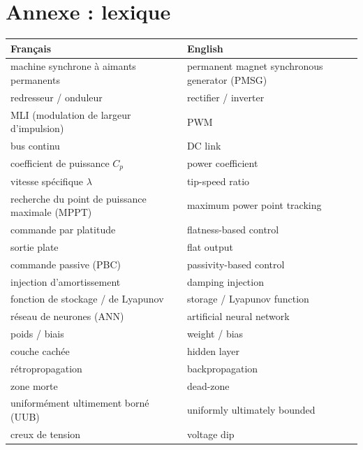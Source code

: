 \documentclass[11pt,a4paper]{article}
\begin{document}
\section*{Annexe : lexique}
\begin{center}\small
\begin{tabular}{ll}
\toprule
Français & English\\
\midrule
machine synchrone à aimants permanents & permanent magnet synchronous generator (PMSG)\\
redresseur / onduleur & rectifier / inverter\\
MLI (modulation de largeur d'impulsion) & PWM\\
bus continu & DC link\\
coefficient de puissance $C_p$ & power coefficient\\
vitesse spécifique $\lambda$ & tip-speed ratio\\
recherche du point de puissance maximale (MPPT) & maximum power point tracking\\
commande par platitude & flatness-based control\\
sortie plate & flat output\\
commande passive (PBC) & passivity-based control\\
injection d'amortissement & damping injection\\
fonction de stockage / de Lyapunov & storage / Lyapunov function\\
réseau de neurones (ANN) & artificial neural network\\
poids / biais & weight / bias\\
couche cachée & hidden layer\\
rétropropagation & backpropagation\\
zone morte & dead-zone\\
uniformément ultimement borné (UUB) & uniformly ultimately bounded\\
creux de tension & voltage dip\\
\bottomrule
\end{tabular}
\end{center}
\end{document}

